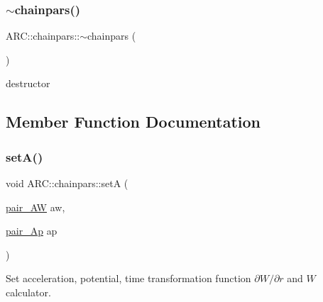 \subsubsection{\texorpdfstring{$\sim$chainpars()}{~chainpars()}}
{\footnotesize\ttfamily A\+R\+C\+::chainpars\+::$\sim$chainpars (\begin{DoxyParamCaption}{ }\end{DoxyParamCaption})\hspace{0.3cm}{\ttfamily [inline]}}



destructor 



\subsection{Member Function Documentation}
\hypertarget{classARC_1_1chainpars_af639f7bc8cfbb2a0330f079df2fd556e}{}\label{classARC_1_1chainpars_af639f7bc8cfbb2a0330f079df2fd556e} 
\subsubsection{\texorpdfstring{set\+A()}{setA()}}
{\footnotesize\ttfamily void A\+R\+C\+::chainpars\+::setA (\begin{DoxyParamCaption}\item[{\hyperlink{namespaceARC_a5c4308ca4a8d0e0ff59fdce30f00274c}{pair\+\_\+\+AW}}]{aw,  }\item[{\hyperlink{namespaceARC_a819446c4644b3a3af7ef11574d0b55e0}{pair\+\_\+\+Ap}}]{ap }\end{DoxyParamCaption})\hspace{0.3cm}{\ttfamily [inline]}}



Set acceleration, potential, time transformation function $\partial W/\partial r$ and $W$ calculator. 

